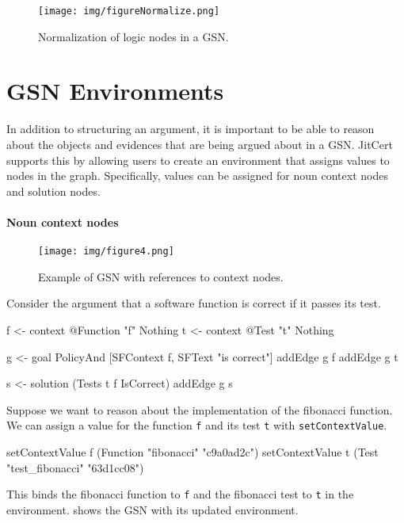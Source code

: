 \documentclass{article}
\newcommand{\jitcert}{JitCert\xspace}
\begin{document}
\begin{figure}
\centering
\texttt{[image: img/figureNormalize.png]}
\caption{Normalization of logic nodes in a GSN.}
\label{fig:normalize}
\end{figure}


\section{GSN Environments}

In addition to structuring an argument, it is important to be able to reason about the objects and evidences that are being argued about in a GSN. 
\jitcert supports this by allowing users to create an environment that assigns values to nodes in the graph. %
Specifically, values can be assigned for noun context nodes and solution nodes. 

\paragraph{Noun context nodes}

\begin{figure}
\centering
\texttt{[image: img/figure4.png]}
\caption{Example of GSN with references to context nodes.}
\label{fig:fig4}
\end{figure}

Consider the argument that a software function is correct if it passes its test.
\begin{mcode}
f <- context @Function "f" Nothing
t <- context @Test "t" Nothing

g <- goal PolicyAnd [SFContext f, SFText "is correct"]
addEdge g f
addEdge g t

s <- solution (Tests t f IsCorrect)
addEdge g s
\end{mcode}
Suppose we want to reason about the implementation of the fibonacci function. 
We can assign a value for the function \texttt{f} and its test \texttt{t} with \texttt{setContextValue}.
\begin{mcode}
setContextValue f (Function "fibonacci" "c9a0ad2c")
setContextValue t (Test "test_fibonacci" "63d1cc08")
\end{mcode}
This binds the fibonacci function to \texttt{f} and the fibonacci test to \texttt{t} in the environment. 
 shows the GSN with its updated environment. 



\end{document}
